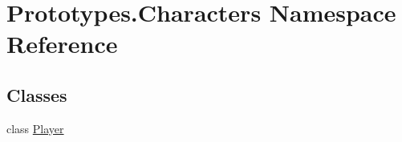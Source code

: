 \hypertarget{namespace_prototypes_1_1_characters}{}\section{Prototypes.\+Characters Namespace Reference}
\label{namespace_prototypes_1_1_characters}
\subsection*{Classes}
\begin{DoxyCompactItemize}
\item 
class \mbox{\hyperlink{class_prototypes_1_1_characters_1_1_player}{Player}}
\end{DoxyCompactItemize}

